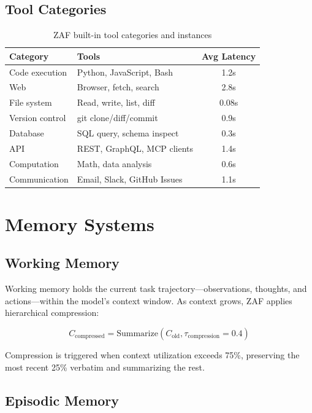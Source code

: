 \documentclass[11pt,a4paper]{article}
\begin{document}
\subsection{Tool Categories}

\begin{table}[H]
\centering
\caption{ZAF built-in tool categories and instances}
\label{tab:tools}
\begin{tabular}{llc}
\toprule
Category & Tools & Avg Latency \\
\midrule
Code execution & Python, JavaScript, Bash & 1.2s \\
Web & Browser, fetch, search & 2.8s \\
File system & Read, write, list, diff & 0.08s \\
Version control & git clone/diff/commit & 0.9s \\
Database & SQL query, schema inspect & 0.3s \\
API & REST, GraphQL, MCP clients & 1.4s \\
Computation & Math, data analysis & 0.6s \\
Communication & Email, Slack, GitHub Issues & 1.1s \\
\bottomrule
\end{tabular}
\end{table}

\section{Memory Systems}

\subsection{Working Memory}

Working memory holds the current task trajectory—observations, thoughts, and actions—within the model's context window. As context grows, ZAF applies hierarchical compression:

\begin{equation}
C_{\text{compressed}} = \text{Summarize}(C_{\text{old}}, \tau_{\text{compression}} = 0.4)
\end{equation}

Compression is triggered when context utilization exceeds 75\%, preserving the most recent 25\% verbatim and summarizing the rest.

\subsection{Episodic Memory}
\end{document}
